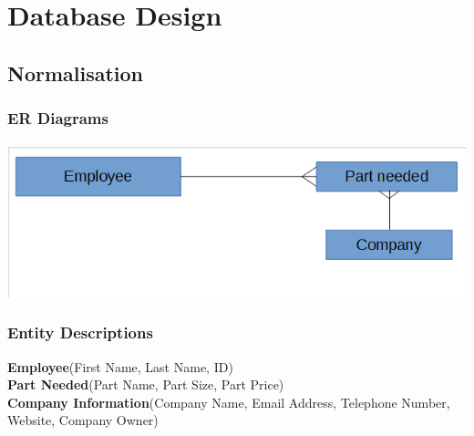 \section{Database Design}

\subsection{Normalisation}

\subsubsection{ER Diagrams}
\begin{center}
\includegraphics[width =\textwidth]{ERDiagram.jpg}
\end{center}
\subsubsection{Entity Descriptions}
\textbf{Employee}(First Name, Last Name, ID) \\
\textbf{Part Needed}(Part Name, Part Size, Part Price) \\
\textbf{Company Information}(Company Name, Email Address, Telephone Number, Website, Company Owner)  \\
